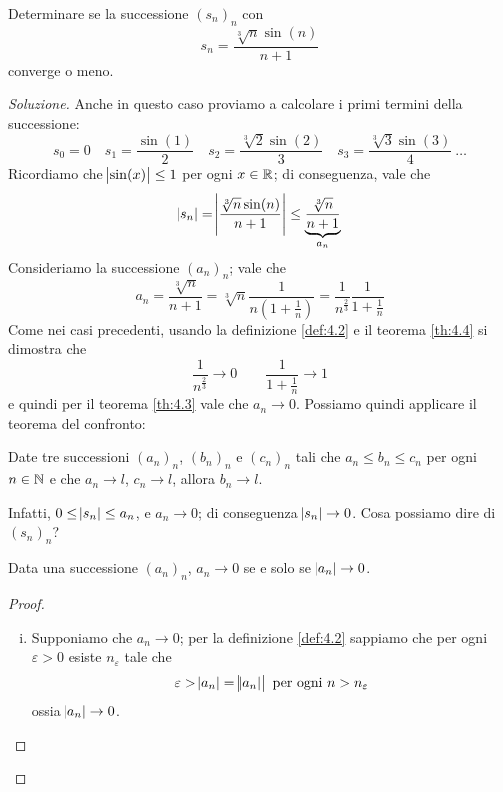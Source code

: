 \begin{exercise}
    \label{ex:4.4}
    Determinare se la successione $(s_n)_n$ con
    \[
    s_n = \frac{\sqrt[3]{n}\sin(n)}{n+1}
    \]
    converge o meno.
\end{exercise}
\begin{proof}[Soluzione]
    Anche in questo caso proviamo a calcolare i primi termini della successione:
    \[
    s_0 = 0 \quad s_1 = \frac{\sin(1)}{2} \quad s_2 = \frac{\sqrt[3]{2}\sin(2)}{3} \quad s_3 = \frac{\sqrt[3]{3}\sin(3)}{4}\ \dots
    \]
    Ricordiamo che $\abs{\sin(x)}\le 1$ per ogni $x\in\amsbb{R}$; di conseguenza, vale che
    \[
    \abs{s_n} = \abs{\frac{\sqrt[3]{n}\sin(n)}{n+1}}\le \underbrace{\frac{\sqrt[3]{n}}{n+1}}_{a_n}
    \]
    Consideriamo la successione $(a_n)_n$; vale che
    \[
    a_n = \frac{\sqrt[3]{n}}{n+1} = \sqrt[3]{n}\frac{1}{n\left(1+\frac{1}{n}\right)} = \frac{1}{n^{\frac{2}{3}}}\frac{1}{1+\frac{1}{n}}
    \]
    Come nei casi precedenti, usando la definizione \ref{def:4.2} e il teorema \ref{th:4.4} si dimostra che
    \[
    \frac{1}{n^{\frac{2}{3}}}\to 0 \qquad \frac{1}{1+\frac{1}{n}}\to 1
    \]
    e quindi per il teorema \ref{th:4.3} vale che $a_n \to 0$. Possiamo quindi applicare il teorema del confronto:
    \begin{tcolorbox}
        \begin{theorem}
            \label{th:4.5}
            Date tre successioni $(a_n)_n$, $(b_n)_n$ e $(c_n)_n$ tali che $a_n \le b_n \le c_n$ per ogni $n\in\amsbb{N}$ e che $a_n \to l$, $c_n \to l$, allora $b_n \to l$.
        \end{theorem}
    \end{tcolorbox}
    Infatti, $0\le \abs{s_n}\le a_n$, e $a_n \to 0$; di conseguenza $\abs{s_n}\to 0$. Cosa possiamo dire di $(s_n)_n$? 
    \begin{tcolorbox}
        \begin{theorem}
            \label{th:4.6}
            Data una successione $(a_n)_n$, $a_n \to 0$ se e solo se $\abs{a_n}\to 0$.
        \end{theorem}
        \begin{proof}
            \begin{enumerate}[(i)]
                \item Supponiamo che $a_n \to 0$; per la definizione \ref{def:4.2} sappiamo che per ogni $\varepsilon>0$ esiste $n_\varepsilon$ tale che
                \[
                \varepsilon>\abs{a_n} = \abs{\abs{a_n}} \ \text{per ogni} \ n>n_\varepsilon
                \]
                ossia $\abs{a_n}\to 0$.

\end{enumerate}
\end{proof}
\end{tcolorbox}
\end{proof}
